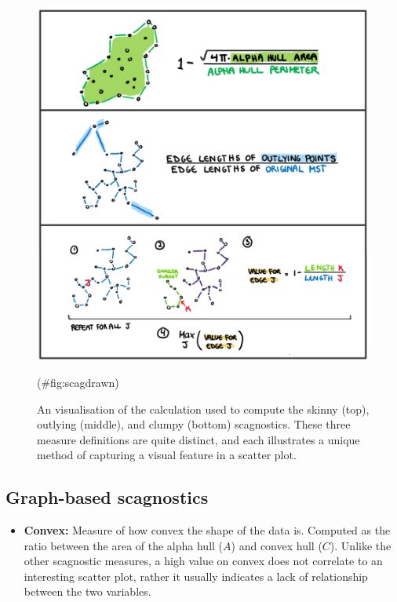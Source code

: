 \begin{Schunk}
\begin{figure}
\includegraphics[width=1\linewidth]{figures/drawnmeasures} \caption[ An visualisation of the calculation used to compute the skinny (top), outlying (middle), and clumpy (bottom) scagnostics]{ An visualisation of the calculation used to compute the skinny (top), outlying (middle), and clumpy (bottom) scagnostics. These three measure definitions are quite distinct, and each illustrates a unique method of capturing a visual feature in a scatter plot.}(\#fig:scagdrawn)
\end{figure}
\end{Schunk}

\hypertarget{graph-based-scagnostics}{%
\subsection{Graph-based scagnostics}\label{graph-based-scagnostics}}

\begin{itemize}
\tightlist
\item
  \textbf{Convex:} Measure of how convex the shape of the data is.
  Computed as the ratio between the area of the alpha hull (\(A\)) and
  convex hull (\(C\)). Unlike the other scagnostic measures, a high
  value on convex does not correlate to an interesting scatter plot,
  rather it usually indicates a lack of relationship between the two
  variables.
\end{itemize}

